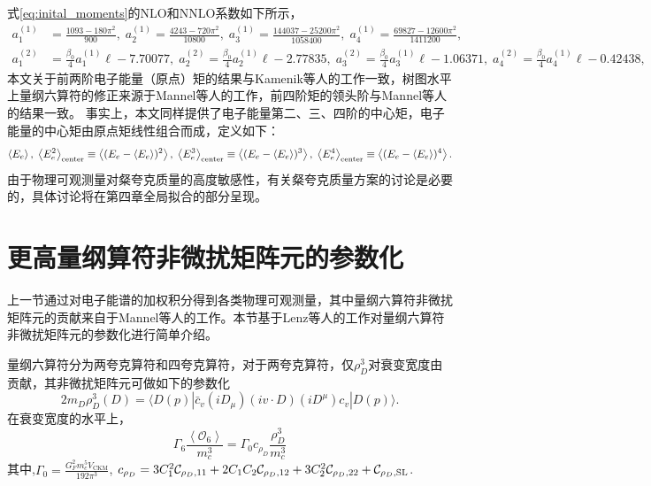       式\eqref{eq:inital_moments}的NLO和NNLO系数如下所示，
      {\scriptsize
      \begin{equation}
      \begin{aligned}
        a^{(1)}_1 &= \frac{1093 - 180\pi^2}{900}, \;
        a^{(1)}_2 = \frac{4243 - 720 \pi^2}{{10800}}, \; 
        a^{(1)}_3 = \frac{144037-25200 \pi^2}{{1058400}}, \; 
        a^{(1)}_4 = \frac{69827-12600 \pi^2}{{1411200}},   \\
        a^{(2)}_1 &= \frac{\beta_0}{4}a^{(1)}_1\ell -7.70077, \; 
        a^{(2)}_2 = \frac{\beta_0}{4}a^{(1)}_2\ell -2.77835, \; 
        a^{(2)}_3 = \frac{\beta_0}{4}a^{(1)}_3\ell -1.06371 , \; 
        a^{(2)}_4 = \frac{\beta_0}{4}a^{(1)}_4\ell -0.42438 , \nonumber
        \end{aligned}
    \end{equation}
    }
        本文关于前两阶电子能量（原点）矩的结果与Kamenik等人的工作\cite{Kamenik:2011zz}一致，树图水平上量纲六算符的修正来源于Mannel等人的工作\cite{Fael:2019umf}，前四阶矩的领头阶与Mannel等人的结果\cite{Fael:2019umf}一致。
        事实上，本文同样提供了电子能量第二、三、四阶的中心矩，电子能量的中心矩由原点矩线性组合而成，定义如下：
        {\scriptsize
        \begin{equation}
        \begin{aligned}
            \left\langle E_e\right\rangle, \;\left\langle E_e^2\right\rangle_{\rm center}\equiv \left\langle (E_e - \langle E_e\rangle)^2 \right\rangle , \; \left\langle E_e^3\right\rangle_{\rm center}\equiv\left\langle (E_e - \langle E_e\rangle)^3 \right\rangle , \; \left\langle E_e^4\right\rangle_{\rm center}\equiv\left\langle (E_e - \langle E_e\rangle)^4 \right\rangle .
            \end{aligned}
        \end{equation}
        }
    由于物理可观测量对粲夸克质量的高度敏感性，有关粲夸克质量方案的讨论是必要的，具体讨论将在第四章全局拟合的部分呈现。
\section{更高量纲算符非微扰矩阵元的参数化}
上一节通过对电子能谱的加权积分得到各类物理可观测量，其中量纲六算符非微扰矩阵元的贡献来自于Mannel等人的工作。本节基于Lenz等人的工作对量纲六算符非微扰矩阵元的参数化进行简单介绍。

量纲六算符分为两夸克算符和四夸克算符，对于两夸克算符，仅$\rho_{D}^{3}$对衰变宽度由贡献，其非微扰矩阵元可做如下的参数化
\begin{equation}
    2 m_D \rho_D^3(D)=\langle D(p)| \bar{c}_v\left(i D_\mu\right)(i v \cdot D)\left(i D^\mu\right) c_v|D(p)\rangle .
    \end{equation}
    在衰变宽度的水平上，
    \begin{equation}
        \Gamma_6 \frac{\left\langle\mathcal{O}_6\right\rangle}{m_c^3}=\Gamma_0 c_{\rho_D} \frac{\rho_D^3}{m_c^3}
        \end{equation}
    其中,$\Gamma_{0}=\frac{G_F^2 m_c^5 V_{\text{CKM}}}{192\pi^3}$, $c_{\rho_D}=3 C_1^2 \mathcal{C}_{\rho_D, 11}+2 C_1 C_2 \mathcal{C}_{\rho_D, 12}+3 C_2^2 \mathcal{C}_{\rho_D, 22}+\mathcal{C}_{\rho_D, \mathrm{S L}}$.

